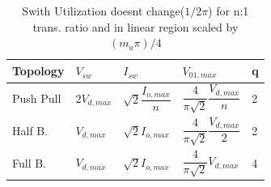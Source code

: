 \documentclass[twocolumn]{article}
\begin{document}






\begin{table}[H]
\centering
\begin{tabular}{lllll}
    Topology & $V_{sw}$ & $I_{sw}$ & $V_{01,max}$ & q \\
    \hline

    Push Pull & $2V_{d,max}$ & $\sqrt2 \dfrac{I_{o,max}}{n}$ & $\dfrac{4}{\pi \sqrt2} \dfrac{V_{d,max}}{n}$ & 2 \\
    Half B. & $V_{d,max}$ & $\sqrt2 I_{o,max}$ & $\dfrac{4}{\pi \sqrt2} \dfrac{V_{d,max}}{2}$ & 2 \\
    Full B. & $V_{d,max}$ & $\sqrt2 I_{o,max}$ & $\dfrac{4}{\pi \sqrt2} V_{d,max}$ & 4 \\
 \end{tabular}   
  \caption{Swith Utilization doesnt change($1/2\pi$) for n:1 trans. ratio and in linear region scaled by $(m_{a}\pi)/4 $}
  
\end{table}
\end{document}

